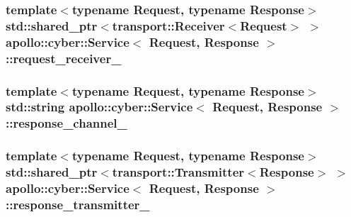 \hypertarget{classapollo_1_1cyber_1_1Service_a91f2641d8746e778f376b818e82e44fa}{
\subsubsection[{request\-\_\-receiver\-\_\-}]{\setlength{\rightskip}{0pt plus 5cm}template$<$typename Request, typename Response$>$ std\-::shared\-\_\-ptr$<${\bf transport\-::\-Receiver}$<$Request$>$ $>$ {\bf apollo\-::cyber\-::\-Service}$<$ Request, Response $>$\-::request\-\_\-receiver\-\_\-\hspace{0.3cm}{\ttfamily [private]}}}\label{classapollo_1_1cyber_1_1Service_a91f2641d8746e778f376b818e82e44fa}
\hypertarget{classapollo_1_1cyber_1_1Service_a3a69243428a43606ce347a23be39381f}{
\subsubsection[{response\-\_\-channel\-\_\-}]{\setlength{\rightskip}{0pt plus 5cm}template$<$typename Request, typename Response$>$ std\-::string {\bf apollo\-::cyber\-::\-Service}$<$ Request, Response $>$\-::response\-\_\-channel\-\_\-\hspace{0.3cm}{\ttfamily [private]}}}\label{classapollo_1_1cyber_1_1Service_a3a69243428a43606ce347a23be39381f}
\hypertarget{classapollo_1_1cyber_1_1Service_a3d0c840429b0e6d6fece389067b81757}{
\subsubsection[{response\-\_\-transmitter\-\_\-}]{\setlength{\rightskip}{0pt plus 5cm}template$<$typename Request, typename Response$>$ std\-::shared\-\_\-ptr$<${\bf transport\-::\-Transmitter}$<$Response$>$ $>$ {\bf apollo\-::cyber\-::\-Service}$<$ Request, Response $>$\-::response\-\_\-transmitter\-\_\-\hspace{0.3cm}{\ttfamily [private]}}}\label{classapollo_1_1cyber_1_1Service_a3d0c840429b0e6d6fece389067b81757}
